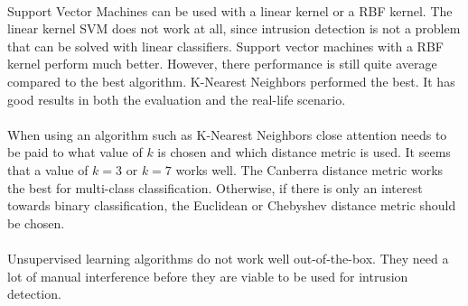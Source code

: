 \\
Support Vector Machines can be used with a linear kernel or a RBF kernel. The linear kernel SVM does not work at all, since intrusion detection is not a problem that can be solved with linear classifiers. Support vector machines with a RBF kernel perform much better. However, there performance is still quite average compared to the best algorithm. K-Nearest Neighbors performed the best. It has good results in both the evaluation and the real-life scenario.\\
\\
When using an algorithm such as K-Nearest Neighbors close attention needs to be paid to what value of $k$ is chosen and which distance metric is used. It seems that a value of $k=3$ or $k=7$ works well. The Canberra distance metric works the best for multi-class classification. Otherwise, if there is only an interest towards binary classification, the Euclidean or Chebyshev distance metric should be chosen. \\
\\
Unsupervised learning algorithms do not work well out-of-the-box. They need a lot of manual interference before they are viable to be used for intrusion detection. 

